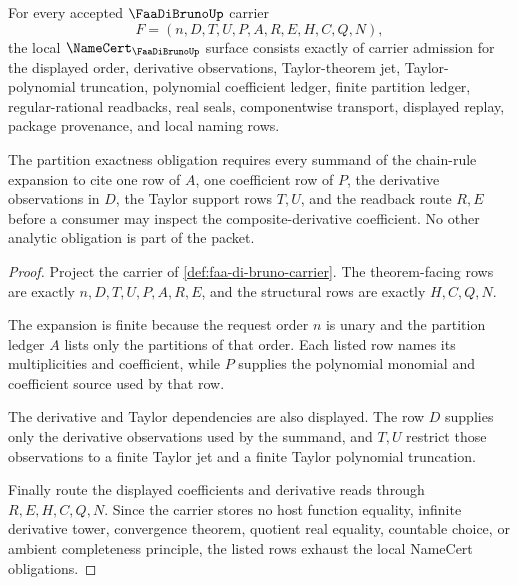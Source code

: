 \begin{theorem}
\label{thm:faa-di-bruno-namecert-obligations}
For every accepted $\FaaDiBrunoUp$ carrier
$$
F=(n,D,T,U,P,A,R,E,H,C,Q,N),
$$
the local $\NameCert_{\FaaDiBrunoUp}$ surface consists exactly of carrier admission for the displayed order, derivative observations, Taylor-theorem jet, Taylor-polynomial truncation, polynomial coefficient ledger, finite partition ledger, regular-rational readbacks, real seals, componentwise transport, displayed replay, package provenance, and local naming rows.

The partition exactness obligation requires every summand of the chain-rule expansion to cite one row of $A$, one coefficient row of $P$, the derivative observations in $D$, the Taylor support rows $T,U$, and the readback route $R,E$ before a consumer may inspect the composite-derivative coefficient. No other analytic obligation is part of the packet.
\end{theorem}
\begin{proof}
Project the carrier of \autoref{def:faa-di-bruno-carrier}. The theorem-facing rows are exactly $n,D,T,U,P,A,R,E$, and the structural rows are exactly $H,C,Q,N$.

The expansion is finite because the request order $n$ is unary and the partition ledger $A$ lists only the partitions of that order. Each listed row names its multiplicities and coefficient, while $P$ supplies the polynomial monomial and coefficient source used by that row.

The derivative and Taylor dependencies are also displayed. The row $D$ supplies only the derivative observations used by the summand, and $T,U$ restrict those observations to a finite Taylor jet and a finite Taylor polynomial truncation.

Finally route the displayed coefficients and derivative reads through $R,E,H,C,Q,N$. Since the carrier stores no host function equality, infinite derivative tower, convergence theorem, quotient real equality, countable choice, or ambient completeness principle, the listed rows exhaust the local NameCert obligations.
\end{proof}

